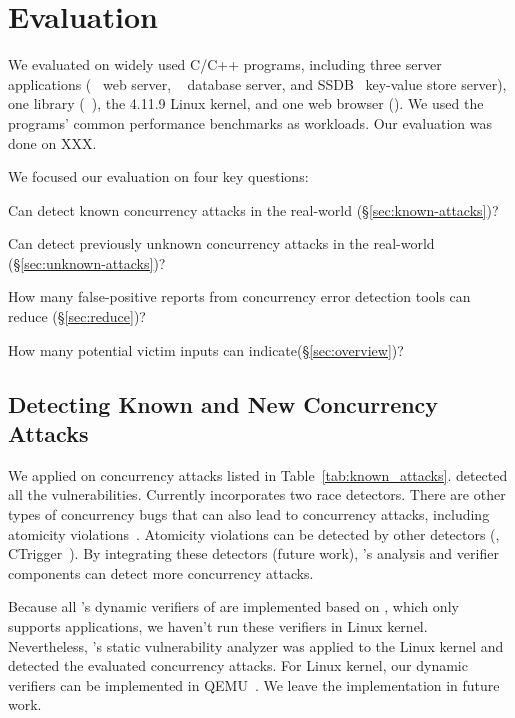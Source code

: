 \section{Evaluation}\label{sec:evaluation}

We evaluated \xxx on \nreproducedProgs widely used C/C++ programs, including 
three server applications (\apache~\cite{apache} web server, 
\mysql~\cite{mysql} database server, and SSDB~\cite{SSDB} 
key-value store server), one library (\libsafe~\cite{libsafe}), the 4.11.9 Linux 
kernel, and one web browser (\chrome). We used the programs' common performance 
benchmarks as workloads. Our evaluation was done on XXX. 


We focused our evaluation on four key questions:
\begin{tightenum}
	
		
	\item Can \xxx detect known concurrency attacks in the real-world
	(\S\ref{sec:known-attacks})?
	
	\item Can \xxx detect previously unknown concurrency attacks in the real-world
	(\S\ref{sec:unknown-attacks})?
	\item How many false-positive reports from concurrency error 
	detection tools can \xxx reduce (\S\ref{sec:reduce})?
	
	\item How many potential victim inputs can \xxx indicate(\S\ref{sec:overview})?
		
	
\end{tightenum}

\subsection{Detecting Known and New Concurrency Attacks}


We applied \xxx on \nknownVul concurrency attacks listed in 
Table~\ref{tab:known_attacks}. \xxx detected all the vulnerabilities.
Currently \xxx incorporates two race detectors. There are other
types of concurrency bugs that can also lead to concurrency attacks, including
atomicity violations~\cite{lu:concurrency-bugs}. Atomicity violations 
can be detected by other detectors (\eg, CTrigger~\cite{ctrigger:asplos09}). By 
integrating these detectors (future work), \xxx's analysis and verifier 
components can detect more concurrency attacks.


Because all \xxx's dynamic verifiers of are implemented based on \lldb, which 
only supports applications, we haven't run these verifiers in Linux kernel. 
Nevertheless, \xxx's static vulnerability analyzer was applied to the Linux 
kernel and detected the evaluated concurrency attacks. For Linux kernel, our 
dynamic verifiers can be implemented in QEMU~\cite{qemu}. We leave the 
implementation in future work.

